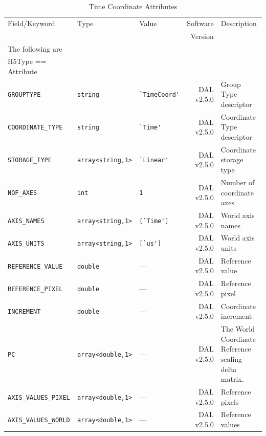 \documentclass[a4paper,10pt,bibtotoc]{scrartcl}
\begin{document}
\begin{table}[p]
\begin{center}
  \begin{tabular}{|lllrp{4cm}|}
    \hline
    \sc Field/Keyword  & \sc Type & \sc Value & \sc Software  & Description \\
    \sc   & \sc & \sc & \sc Version  & \\
    \hline \hline
    \sc The following are & \sc & \sc & \sc   &\\
    \sc H5Type == Attribute & \sc & \sc & \sc   &\\
    \hline 
    \small{\verb|GROUPTYPE|} & \verb|string| & \verb|`TimeCoord'| & DAL v2.5.0 & Group Type descriptor \\
    \small{\verb|COORDINATE_TYPE|} & \verb|string| & \verb|`Time'| & DAL v2.5.0 & Coordinate Type descriptor \\
    \small{\verb|STORAGE_TYPE|} & \small\verb|array<string,1>| & \verb|`Linear'| & DAL v2.5.0 & Coordinate storage type \\ 
    \small{\verb|NOF_AXES|}  & \verb|int| & \verb|1| & DAL v2.5.0 & Number of coordinate axes \\
    \small{\verb|AXIS_NAMES|}  & \verb|array<string,1>| & \verb|[`Time']| & DAL v2.5.0 & World axis names \\
    \small{\verb|AXIS_UNITS|}  & \verb|array<string,1>| & \verb|[`us']| & DAL v2.5.0 & World axis units \\
    \small{\verb|REFERENCE_VALUE|}  & \verb|double| & --- & DAL v2.5.0 & Reference value \\
    \small{\verb|REFERENCE_PIXEL|}  & \verb|double| & --- & DAL v2.5.0 & Reference pixel \\
    \small{\verb|INCREMENT|}  & \verb|double| & --- & DAL v2.5.0 & Coordinate increment \\
    \small{\verb|PC|}  & \verb|array<double,1>| & --- & DAL v2.5.0 & The World Coordinate Reference scaling delta matrix. \\
    \small{\verb|AXIS_VALUES_PIXEL|}  & \verb|array<double,1>| & --- & DAL v2.5.0 & Reference pixels \\
    \small{\verb|AXIS_VALUES_WORLD|}  & \verb|array<double,1>| & --- & DAL v2.5.0 & Reference values \\
    \hline
  \end{tabular}
  \caption{Time Coordinate Attributes}
  \label{tab:temporal coordinate}
\end{center}
\end{table}
\end{document}
